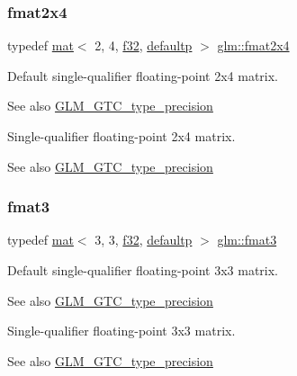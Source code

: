 \subsubsection{\texorpdfstring{fmat2x4}{fmat2x4}}
{\footnotesize\ttfamily typedef \hyperlink{structglm_1_1mat}{mat}$<$ 2, 4, \hyperlink{group__gtc__type__precision_ga0ec999b57f5330d9021256e96038df04}{f32}, \hyperlink{namespaceglm_a36ed105b07c7746804d7fdc7cc90ff25a9d21ccd8b5a009ec7eb7677befc3bf51}{defaultp} $>$ \hyperlink{group__gtc__type__precision_gabaf7537f5284456254b1da1cd6fd2b78}{glm\+::fmat2x4}}

Default single-\/qualifier floating-\/point 2x4 matrix. \begin{DoxySeeAlso}{See also}
\hyperlink{group__gtc__type__precision}{G\+L\+M\+\_\+\+G\+T\+C\+\_\+type\+\_\+precision}
\end{DoxySeeAlso}
Single-\/qualifier floating-\/point 2x4 matrix. \begin{DoxySeeAlso}{See also}
\hyperlink{group__gtc__type__precision}{G\+L\+M\+\_\+\+G\+T\+C\+\_\+type\+\_\+precision} 
\end{DoxySeeAlso}
\mbox{\label{group__gtc__type__precision_ga5d1e667b4d603704203af21ff6dbe4e5}} 
\subsubsection{\texorpdfstring{fmat3}{fmat3}}
{\footnotesize\ttfamily typedef \hyperlink{structglm_1_1mat}{mat}$<$ 3, 3, \hyperlink{group__gtc__type__precision_ga0ec999b57f5330d9021256e96038df04}{f32}, \hyperlink{namespaceglm_a36ed105b07c7746804d7fdc7cc90ff25a9d21ccd8b5a009ec7eb7677befc3bf51}{defaultp} $>$ \hyperlink{group__gtc__type__precision_ga5d1e667b4d603704203af21ff6dbe4e5}{glm\+::fmat3}}

Default single-\/qualifier floating-\/point 3x3 matrix. \begin{DoxySeeAlso}{See also}
\hyperlink{group__gtc__type__precision}{G\+L\+M\+\_\+\+G\+T\+C\+\_\+type\+\_\+precision}
\end{DoxySeeAlso}
Single-\/qualifier floating-\/point 3x3 matrix. \begin{DoxySeeAlso}{See also}
\hyperlink{group__gtc__type__precision}{G\+L\+M\+\_\+\+G\+T\+C\+\_\+type\+\_\+precision} 
\end{DoxySeeAlso}
\mbox{\label{group__gtc__type__precision_gaed9c8fe9d2e094bf3bc7c606bbae1a6b}} 
